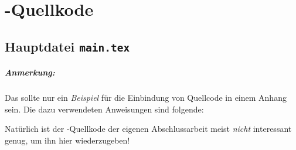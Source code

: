\chapter{\latex-Quellkode}
\label{app:latex}

\section*{Hauptdatei \texttt{main.tex}}

\paragraph{Anmerkung:}
Das sollte nur ein \emph{Beispiel} für die Einbindung von Quellcode
in einem Anhang sein. Die dazu verwendeten Anweisungen sind folgende:
%
\begin{LaTeXCode}[numbers=none]
\begin{footnotesize}

\end{footnotesize}
\end{LaTeXCode}
%
Natürlich ist der \latex-Quellkode der eigenen
Abschlussarbeit meist \emph{nicht} interessant genug, um ihn hier
wiederzugeben!

\begin{footnotesize}

\end{footnotesize}






